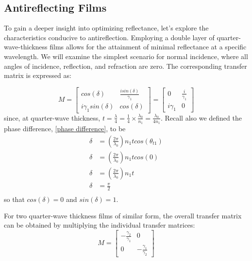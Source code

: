 \subsection{Antireflecting Films}
To gain a deeper insight into optimizing reflectance, let's explore the characteristics conducive to antireflection. Employing a double layer of quarter-wave-thickness films allows for the attainment of minimal reflectance at a specific wavelength. We will examine the simplest scenario for normal incidence, where all angles of incidence, reflection, and refraction are zero. The corresponding transfer matrix is expressed as: %

    \[
    M = 
            \begin{bmatrix}
            cos(\delta) & \frac{isin(\delta)}{\gamma_1} \\
            i\gamma_1sin(\delta) & cos(\delta)
            \end{bmatrix} = 
                \begin{bmatrix}
                0 & \frac{i}{\gamma_1}  \\
                i\gamma_1 & 0
              \end{bmatrix}
    \]
since, at quarter-wave thickness, $t=\frac{\lambda}{4} = \frac{1}{4} \times \frac{\lambda_0}{n_1} = \frac{\lambda_0}{4n_1}$. Recall also we defined the phase difference, \ref{phase difference}, to be
    \begin{align*}
        \delta &= \left(\frac{2\pi}{\lambda_0}\right) n_1tcos(\theta_{t1})\\
        \delta &= \left(\frac{2\pi}{\lambda_0}\right) n_1tcos(0) \\
        \delta &= \left(\frac{2\pi}{\lambda_0}\right) n_1t\\
        \delta &= \frac{\pi}{2} \\
    \end{align*}
so that $cos(\delta) = 0$ and $sin(\delta) = 1$.

For two quarter-wave thickness films of similar form, the overall transfer matrix can be obtained by multiplying the individual transfer matrices:
    \[
    M = 
            \begin{bmatrix}
            -\frac{\gamma_2}{\gamma_1} & 0 \\
            0 & -\frac{\gamma_1}{\gamma_2}
          \end{bmatrix}
    \]

